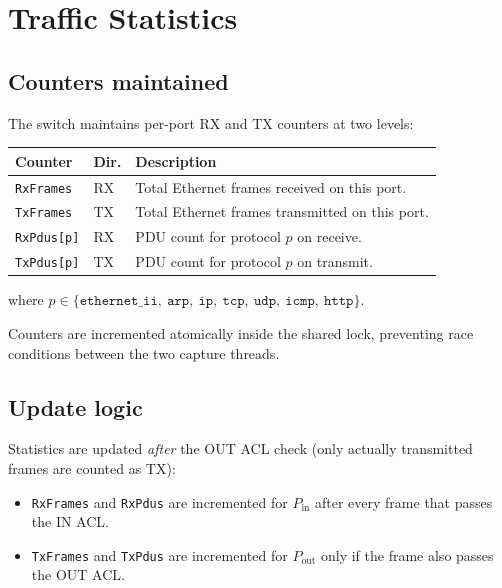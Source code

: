 \documentclass[12pt,a4paper]{article}
\begin{document}
\section{Traffic Statistics}
\label{sec:stats}

\subsection{Counters maintained}

The switch maintains per-port RX and TX counters at two levels:

\begin{center}
\begin{tabular}{lll}
\toprule
\textbf{Counter}   & \textbf{Dir.} & \textbf{Description} \\
\midrule
\texttt{RxFrames}  & RX & Total Ethernet frames received on this port. \\
\texttt{TxFrames}  & TX & Total Ethernet frames transmitted on this port. \\
\texttt{RxPdus[p]} & RX & PDU count for protocol $p$ on receive. \\
\texttt{TxPdus[p]} & TX & PDU count for protocol $p$ on transmit. \\
\bottomrule
\end{tabular}
\end{center}

where $p \in \{\texttt{ethernet\_ii},\ \texttt{arp},\ \texttt{ip},\
\texttt{tcp},\ \texttt{udp},\ \texttt{icmp},\ \texttt{http}\}$.

Counters are incremented atomically inside the shared lock, preventing
race conditions between the two capture threads.

\subsection{Update logic}

Statistics are updated \emph{after} the OUT ACL check (only actually
transmitted frames are counted as TX):

\begin{itemize}[noitemsep]
  \item \texttt{RxFrames} and \texttt{RxPdus} are incremented for
    $P_{\mathrm{in}}$ after every frame that passes the IN ACL.
  \item \texttt{TxFrames} and \texttt{TxPdus} are incremented for
    $P_{\mathrm{out}}$ only if the frame also passes the OUT ACL.
\end{itemize}
\end{document}
